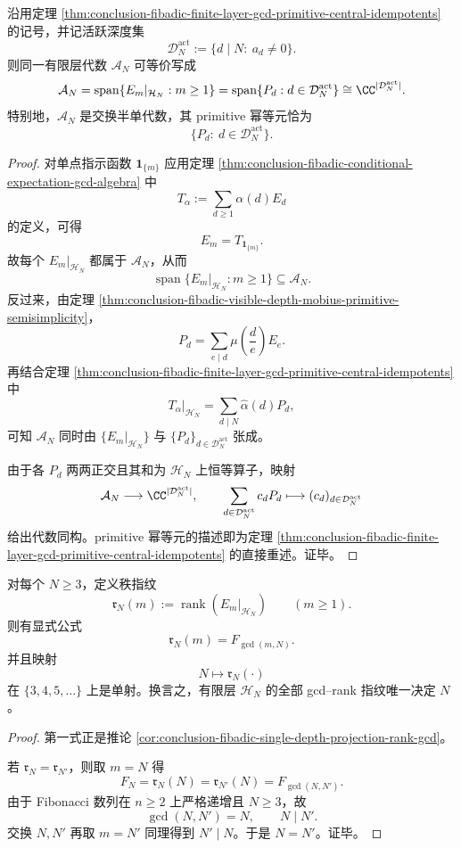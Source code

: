 \begin{corollary}[有限层可见条件期望代数的半单坐标化]\label{cor:conclusion-fibadic-finite-layer-conditional-expectation-semisimple-coordinates}
沿用定理 \ref{thm:conclusion-fibadic-finite-layer-gcd-primitive-central-idempotents} 的记号，并记活跃深度集
\[
\mathcal D_N^{\mathrm{act}}:=\{d\mid N:\ a_d\neq 0\}.
\]
则同一有限层代数 \(\mathcal A_N\) 可等价写成
\[
\mathcal A_N
=
\operatorname{span}\{E_m|_{\mathcal H_N}:m\ge 1\}
=
\operatorname{span}\{P_d:d\in \mathcal D_N^{\mathrm{act}}\}
\cong
\CC^{|\mathcal D_N^{\mathrm{act}}|}.
\]
特别地，\(\mathcal A_N\) 是交换半单代数，其 primitive 幂等元恰为
\[
\{P_d:\ d\in \mathcal D_N^{\mathrm{act}}\}.
\]
\end{corollary}
\begin{proof}
对单点指示函数 \(\mathbf 1_{\{m\}}\) 应用定理 \ref{thm:conclusion-fibadic-conditional-expectation-gcd-algebra} 中
\[
T_\alpha:=\sum_{d\ge 1}\alpha(d)E_d
\]
的定义，可得
\[
E_m=T_{\mathbf 1_{\{m\}}}.
\]
故每个 \(E_m|_{\mathcal H_N}\) 都属于 \(\mathcal A_N\)，从而
\[
\operatorname{span}\{E_m|_{\mathcal H_N}:m\ge 1\}\subseteq \mathcal A_N.
\]
反过来，由定理 \ref{thm:conclusion-fibadic-visible-depth-mobius-primitive-semisimplicity}，
\[
P_d=\sum_{e\mid d}\mu\!\left(\frac{d}{e}\right)E_e.
\]
再结合定理 \ref{thm:conclusion-fibadic-finite-layer-gcd-primitive-central-idempotents} 中
\[
T_\alpha|_{\mathcal H_N}
=
\sum_{d\mid N}\widehat\alpha(d)P_d,
\]
可知 \(\mathcal A_N\) 同时由 \(\{E_m|_{\mathcal H_N}\}\) 与 \(\{P_d\}_{d\in\mathcal D_N^{\mathrm{act}}}\) 张成。

由于各 \(P_d\) 两两正交且其和为 \(\mathcal H_N\) 上恒等算子，映射
\[
\mathcal A_N\longrightarrow \CC^{|\mathcal D_N^{\mathrm{act}}|},
\qquad
\sum_{d\in\mathcal D_N^{\mathrm{act}}}c_dP_d\longmapsto (c_d)_{d\in\mathcal D_N^{\mathrm{act}}}
\]
给出代数同构。primitive 幂等元的描述即为定理 \ref{thm:conclusion-fibadic-finite-layer-gcd-primitive-central-idempotents} 的直接重述。证毕。
\end{proof}

\begin{theorem}\label{thm:conclusion-fibadic-gcd-rank-fingerprint-rigidity}
对每个 \(N\ge 3\)，定义秩指纹
\[
\mathfrak r_N(m):=\operatorname{rank}(E_m|_{\mathcal H_N})
\qquad
(m\ge 1).
\]
则有显式公式
\[
\mathfrak r_N(m)=F_{\gcd(m,N)}.
\]
并且映射
\[
N\longmapsto \mathfrak r_N(\cdot)
\]
在 \(\{3,4,5,\dots\}\) 上是单射。换言之，有限层 \(\mathcal H_N\) 的全部 gcd--rank 指纹唯一决定 \(N\)。
\end{theorem}
\begin{proof}
第一式正是推论 \ref{cor:conclusion-fibadic-single-depth-projection-rank-gcd}。

若 \(\mathfrak r_N=\mathfrak r_{N'}\)，则取 \(m=N\) 得
\[
F_N=\mathfrak r_N(N)=\mathfrak r_{N'}(N)=F_{\gcd(N,N')}.
\]
由于 Fibonacci 数列在 \(n\ge 2\) 上严格递增且 \(N\ge 3\)，故
\[
\gcd(N,N')=N,
\qquad
N\mid N'.
\]
交换 \(N,N'\) 再取 \(m=N'\) 同理得到 \(N'\mid N\)。于是 \(N=N'\)。证毕。
\end{proof}

